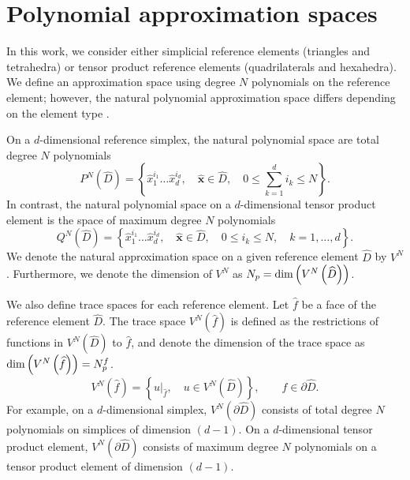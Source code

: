 \documentclass[review]{siamart0216}
\theoremstyle{assumption}
\renewcommand{\hat}[1]{\hat{#1}}
\newcommand{\LRp}[1]{\left( #1 \right)}
\newcommand{\LRc}[1]{\left\{ #1 \right\}}
\renewcommand{\hat}{\widehat}
\begin{document}
\section{Polynomial approximation spaces}

In this work, we consider either simplicial reference elements (triangles and tetrahedra) or tensor product reference elements (quadrilaterals and hexahedra).  We define an approximation space using degree $N$ polynomials on the reference element; however, the natural polynomial approximation space differs depending on the element type \cite{chan2015gpu}.  

On a $d$-dimensional reference simplex, the natural polynomial space are total degree $N$ polynomials 
\[
P^N\LRp{\hat{D}} = \LRc{\hat{x}_1^{i_1}\ldots\hat{x}_d^{i_d}, \quad \hat{\bm{x}} \in \hat{D}, \quad 0\leq \sum_{k=1}^d i_k \leq N}.
\]
In contrast, the natural polynomial space on a $d$-dimensional tensor product element is the space of maximum degree $N$ polynomials
\[
Q^N\LRp{\hat{D}} = \LRc{\hat{x}_1^{i_1}\ldots\hat{x}_d^{i_d}, \quad \hat{\bm{x}} \in \hat{D}, \quad 0\leq i_k \leq N, \quad k = 1,\ldots, d}.
\]
We denote the natural approximation space on a given reference element $\hat{D}$ by $V^N$.  Furthermore, we denote the dimension of $V^N$ as $N_p = {\rm dim}\LRp{V^N\LRp{\hat{D}}}$.  

We also define trace spaces for each reference element.  Let $\hat{f}$ be a face of the reference element $\hat{D}$.  The trace space $V^N \LRp{\hat{f}}$ is defined as the restrictions of functions in $V^N\LRp{\hat{D}}$ to $\hat{f}$, and denote the dimension of the trace space as ${\rm dim}\LRp{V^N\LRp{{\hat{f}}}} = N^f_p$.  
\[
V^N \LRp{\hat{f}} = \LRc{ \left.u\right|_{\hat{f}}, \quad u \in V^N\LRp{\hat{D}}}, \qquad \hat{f}\in \partial\hat{D}.
\]
For example, on a $d$-dimensional simplex, $V^N \LRp{\partial \hat{D}}$ consists of total degree $N$ polynomials on simplices of dimension $(d-1)$.  On a $d$-dimensional tensor product element, $V^N \LRp{\partial \hat{D}}$ consists of maximum degree $N$ polynomials on a tensor product element of dimension $(d-1)$.  



\end{document}
